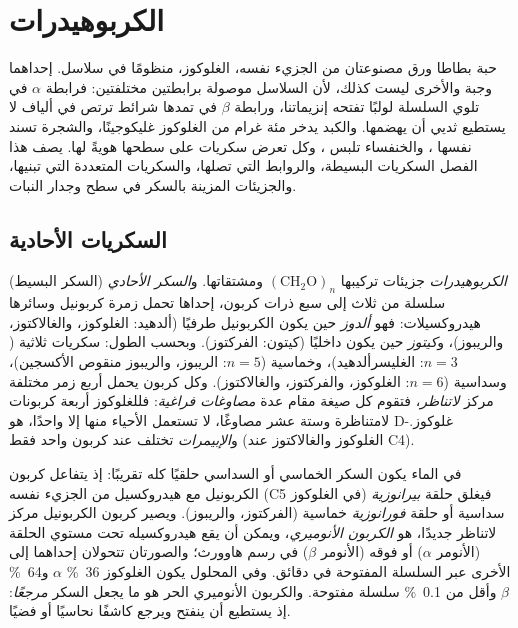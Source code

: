 \chapter{الكربوهيدرات}\label{ch:b1:carbohydrates}

حبة بطاطا  ورق مصنوعتان من الجزيء نفسه، الغلوكوز، منظومًا في
سلاسل. إحداهما وجبة والأخرى ليست كذلك، لأن السلاسل موصولة برابطتين
مختلفتين: فرابطة $\alpha$ في  تلوي السلسلة لولبًا تفتحه
إنزيماتنا، ورابطة $\beta$ في  تمدها شرائط ترتص في ألياف لا
يستطيع ثديي أن يهضمها. والكبد يدخر مئة غرام من الغلوكوز غليكوجينًا،
والشجرة تسند نفسها ، والخنفساء تلبس ، وكل  تعرض
سكريات على سطحها هويةً لها. يصف هذا الفصل السكريات البسيطة، والروابط
التي تصلها، والسكريات المتعددة التي تبنيها، والجزيئات المزينة
بالسكر في سطح  وجدار النبات.

\section{السكريات الأحادية}

\begin{definition}\label{def:b1:carbohydrates:monosaccharide}
\emph{الكربوهيدرات} جزيئات تركيبها
$(\mathrm{CH_2O})_n$ ومشتقاتها. و\emph{السكر الأحادي}
(السكر البسيط) سلسلة من ثلاث إلى سبع ذرات كربون، إحداها تحمل زمرة
كربونيل وسائرها هيدروكسيلات: فهو \emph{ألدوز} حين يكون
الكربونيل طرفيًا (ألدهيد: الغلوكوز، والغالاكتوز، والريبوز)،
و\emph{كيتوز} حين يكون داخليًا (كيتون: الفركتوز).
وبحسب الطول: سكريات ثلاثية ($n = 3$: الغليسرألدهيد)، وخماسية
($n = 5$: الريبوز، والريبوز منقوص الأكسجين)، وسداسية ($n = 6$:
الغلوكوز، والفركتوز، والغالاكتوز). وكل كربون يحمل أربع زمر مختلفة
مركز \emph{لاتناظر}، فتقوم كل صيغة مقام عدة \emph{مصاوغات
فراغية}: فللغلوكوز أربعة كربونات لامتناظرة وستة عشر مصاوغًا، لا
تستعمل الأحياء منها إلا واحدًا، هو D-غلوكوز. و\emph{الإبيمرات} تختلف
عند كربون واحد فقط (الغلوكوز والغالاكتوز عند C4).
\end{definition}

\begin{proposition}\label{prop:b1:carbohydrates:rings}
في الماء يكون السكر الخماسي أو السداسي حلقيًا كله تقريبًا: إذ يتفاعل
كربون الكربونيل مع هيدروكسيل من الجزيء نفسه (C5 في الغلوكوز) فيغلق
حلقة \emph{بيرانوزية} سداسية أو حلقة \emph{فورانوزية} خماسية
(الفركتوز، والريبوز). ويصير كربون الكربونيل مركز لاتناظر جديدًا، هو
\emph{الكربون الأنوميري}، ويمكن أن يقع هيدروكسيله تحت مستوي الحلقة
(الأنومر $\alpha$) أو فوقه (الأنومر $\beta$) في رسم هاوورث؛ والصورتان
تتحولان إحداهما إلى الأخرى عبر السلسلة المفتوحة في دقائق. وفي
المحلول يكون الغلوكوز \qty{36}{\%} $\alpha$ و\qty{64}{\%} $\beta$
وأقل من \qty{0.1}{\%} سلسلة مفتوحة. والكربون الأنوميري الحر هو ما
يجعل السكر \emph{مرجعًا}: إذ يستطيع أن ينفتح ويرجع كاشفًا نحاسيًا أو
فضيًا.
\end{proposition}

